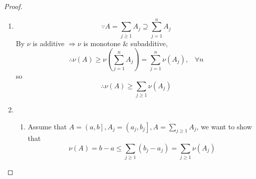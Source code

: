 \begin{proof}
    \text{}
	\begin{enumerate}
		\item 
		\begin{equation}
		\because A = \sum\limits_{j \geqslant 1} {{A_j}}  \supseteq \sum\limits_{j = 1}^n {{A_j}} 
		\label{eq6.4}
		\end{equation}
		By  $ \nu $ is additive $ \Rightarrow \nu $ is monotone \& subadditive,
		\begin{equation}
		\therefore \nu \left( A \right) \geqslant \nu \left( {\sum\limits_{j = 1}^n {{A_j}} } \right) = \sum\limits_{j = 1}^n {\nu \left( {{A_j}} \right)} ,\;\;\;\forall n
		\label{eq6.5}
		\end{equation}
		so 
		\begin{equation}
		\therefore \nu \left( A \right) \geqslant \sum\limits_{j \geqslant 1} {\nu \left( {{A_j}} \right)} 
		\label{eq6.6}
		\end{equation}
		\item 
		\begin{enumerate}
			\item Assume that $A = \left( {a,b} \right],{A_j} = \left( {{a_j},{b_j}} \right],A = \sum\limits_{j \geqslant 1} {{A_j}} $, we want to show that
			\begin{equation}
			\nu \left( A \right) = b - a \leqslant \sum\limits_{j \geqslant 1} {\left( {{b_j} - {a_j}} \right)}  = \sum\limits_{j \geqslant 1} {\nu \left( {{A_j}} \right)} 
			\label{eq6.7}
			\end{equation}
			

\end{enumerate}
\end{enumerate}
\end{proof}
